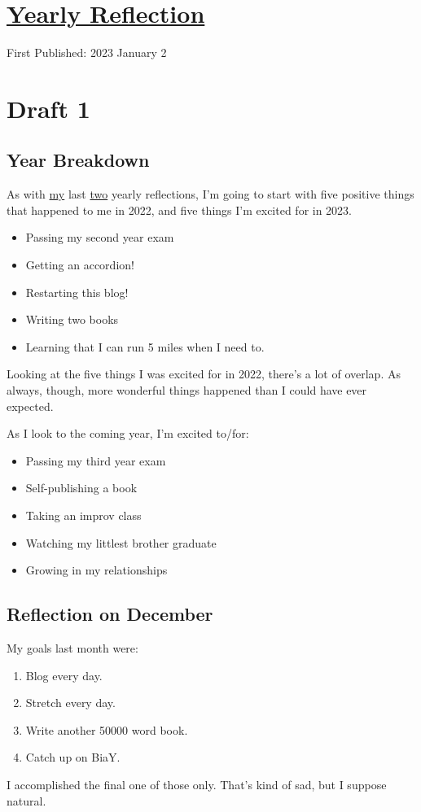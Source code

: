 \documentclass[12pt]{article}[titlepage]
\renewcommand{\,}{\textsuperscript{,}}
\begin{document}
\doublespacing
\section{\href{reflection-2022.html}{Yearly Reflection}}
First Published: 2023 January 2

\section{Draft 1}
\subsection{Year Breakdown}
As with \href{restarting.html}{my} last \href{ending-18.html}{two} yearly reflections, I'm going to start with five positive things that happened to me in 2022, and five things I'm excited for in 2023.

\begin{itemize}
\item Passing my second year exam
\item Getting an accordion!
\item Restarting this blog!
\item Writing two books
\item Learning that I can run 5 miles when I need to.
\end{itemize}

Looking at the five things I was excited for in 2022, there's a lot of overlap.
As always, though, more wonderful things happened than I could have ever expected.

As I look to the coming year, I'm excited to/for:
\begin{itemize}
\item Passing my third year exam
\item Self-publishing a book
\item Taking an improv class
\item Watching my littlest brother graduate
\item Growing in my relationships
\end{itemize}
\subsection{Reflection on December}
My goals last month were:
\begin{enumerate}
\item Blog every day.
\item Stretch every day.
\item Write another 50000 word book.
\item Catch up on BiaY.
\end{enumerate}
I accomplished the final one of those only.
That's kind of sad, but I suppose natural.
\end{document}

